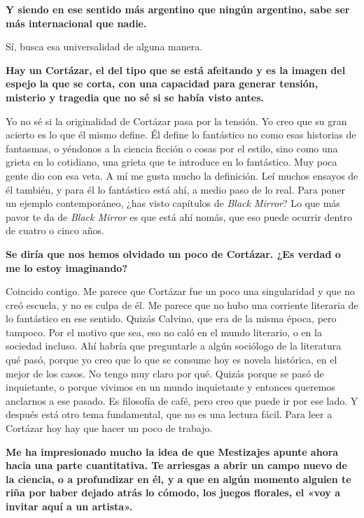 \documentclass[11pt,a4paper]{article}
\newcommand{\preg}[1]{\textbf{#1}}
\begin{document}
\preg{Y siendo en ese sentido más argentino que ningún argentino, sabe ser más internacional que nadie.}

Sí, busca esa universalidad de alguna manera.

\preg{Hay un Cortázar, el del tipo que se está afeitando y es la imagen del espejo la que se corta, con una capacidad para generar tensión, misterio y tragedia que no sé si se había visto antes.}

Yo no sé si la originalidad de Cortázar pasa por la tensión. Yo creo que su gran acierto es lo que él mismo define. Él define lo fantástico no como esas historias de fantasmas, o yéndonos a la ciencia ficción o cosas por el estilo, sino como una grieta en lo cotidiano, una grieta que te introduce en lo fantástico. Muy poca gente dio con esa veta. A mí me gusta mucho la definición. Leí muchos ensayos de él también, y para él lo fantástico está ahí, a medio paso de lo real. Para poner un ejemplo contemporáneo, ¿has visto capítulos de \emph{Black Mirror}? Lo que más pavor te da de \emph{Black Mirror} es que está ahí nomás, que eso puede ocurrir dentro de cuatro o cinco años.

\preg{Se diría que nos hemos olvidado un poco de Cortázar. ¿Es verdad o me lo estoy imaginando?}

Coincido contigo. Me parece que Cortázar fue un poco una singularidad y que no creó escuela, y no es culpa de él. Me parece que no hubo una corriente literaria de lo fantástico en ese sentido. Quizás Calvino, que era de la misma época, pero tampoco. Por el motivo que sea, eso no caló en el mundo literario, o en la sociedad incluso. Ahí habría que preguntarle a algún sociólogo de la literatura qué pasó, porque yo creo que lo que se consume hoy es novela histórica, en el mejor de los casos. No tengo muy claro por qué. Quizás porque se pasó de inquietante, o porque vivimos en un mundo inquietante y entonces queremos anclarnos a ese pasado. Es filosofía de café, pero creo que puede ir por ese lado. Y después está otro tema fundamental, que no es una lectura fácil. Para leer a Cortázar hoy hay que hacer un poco de trabajo.

\preg{Me ha impresionado mucho la idea de que Mestizajes apunte ahora hacia una parte cuantitativa. Te arriesgas a abrir un campo nuevo de la ciencia, o a profundizar en él, y a que en algún momento alguien te riña por haber dejado atrás lo cómodo, los juegos florales, el «voy a invitar aquí a un artista».}
\end{document}
